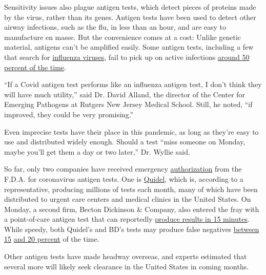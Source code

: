 Sensitivity issues also plague antigen tests, which detect pieces of
proteins made by the virus, rather than its genes. Antigen tests have
been used to detect other airway infections, such as the flu, in less
than an hour, and are easy to manufacture en masse. But the convenience
comes at a cost: Unlike genetic material, antigens can't be amplified
easily. Some antigen tests, including a few that search for
\href{https://www.cdc.gov/flu/professionals/diagnosis/clinician_guidance_ridt.htm}{influenza
viruses}, fail to pick up on active infections
\href{https://www.cdc.gov/flu/professionals/diagnosis/clinician_guidance_ridt.htm}{around
50 percent of the time}.

``If a Covid antigen test performs like an influenza antigen test, I
don't think they will have much utility,'' said Dr. David Alland, the
director of the Center for Emerging Pathogens at Rutgers New Jersey
Medical School. Still, he noted, ``if improved, they could be very
promising.''

Even imprecise tests have their place in this pandemic, as long as
they're easy to use and distributed widely enough. Should a test ``miss
someone on Monday, maybe you'll get them a day or two later,'' Dr.
Wyllie said.

So far, only two companies have received emergency
\href{https://www.fda.gov/news-events/press-announcements/coronavirus-covid-19-update-fda-authorizes-first-antigen-test-help-rapid-detection-virus-causes}{authorization}
from the F.D.A. for coronavirus antigen tests. One is
\href{https://www.nytimes3xbfgragh.onion/2020/05/09/health/antigen-testing-fda-coronavirus.html}{Quidel},
which is, according to a representative, producing millions of tests
each month, many of which have been distributed to urgent care centers
and medical clinics in the United States. On Monday, a second firm,
Becton Dickinson \& Company, also entered the fray with a point-of-care
antigen test that can reportedly
\href{https://www.nytimes3xbfgragh.onion/reuters/2020/07/06/us/06reuters-health-coronavirus-becton-dickinson.html}{produce
results in 15 minutes}. While speedy, both Quidel's and BD's tests may
produce false negatives
\href{https://investors.bd.com/news-releases/news-release-details/bd-launches-portable-rapid-point-care-antigen-test-detect-sars}{between
15}
\href{https://www.sciencemag.org/news/2020/05/coronavirus-antigen-tests-quick-and-cheap-too-often-wrong}{and
20 percent} of the time.

Other antigen tests have made headway overseas, and experts estimated
that several more will likely seek clearance in the United States in
coming months.

